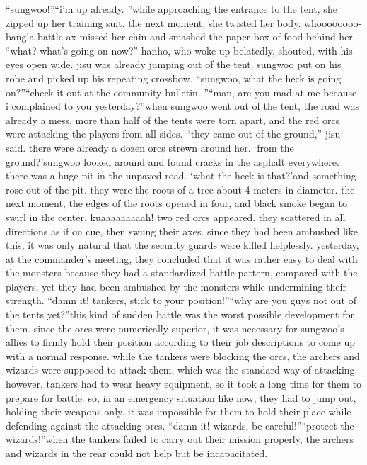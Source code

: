 “sungwoo!”“i’m up already.
”while approaching the entrance to the tent, she zipped up her training suit.
 the next moment, she twisted her body.
whoooooooo- bang!a battle ax missed her chin and smashed the paper box of food behind her.
“what? what’s going on now?” hanho, who woke up belatedly, shouted, with his eyes open wide.
jisu was already jumping out of the tent.
 sungwoo put on his robe and picked up his repeating crossbow.
“sungwoo, what the heck is going on?”“check it out at the community bulletin.
”“man, are you mad at me because i complained to you yesterday?”when sungwoo went out of the tent, the road was already a mess.
 more than half of the tents were torn apart, and the red orcs were attacking the players from all sides.
“they came out of the ground,” jisu said.
there were already a dozen orcs strewn around her.
‘from the ground?’sungwoo looked around and found cracks in the asphalt everywhere.
 there was a huge pit in the unpaved road.
‘what the heck is that?’and something rose out of the pit.
 they were the roots of a tree about 4 meters in diameter.
the next moment, the edges of the roots opened in four, and black smoke began to swirl in the center.
kuaaaaaaaaah!
two red orcs appeared.
 they scattered in all directions as if on cue, then swung their axes.
since they had been ambushed like this, it was only natural that the security guards were killed helplessly.
yesterday, at the commander’s meeting, they concluded that it was rather easy to deal with the monsters because they had a standardized battle pattern, compared with the players, yet they had been ambushed by the monsters while undermining their strength.
“damn it! tankers, stick to your position!”“why are you guys not out of the tents yet?”this kind of sudden battle was the worst possible development for them.
since the orcs were numerically superior, it was necessary for sungwoo’s allies to firmly hold their position according to their job descriptions to come up with a normal response.
while the tankers were blocking the orcs, the archers and wizards were supposed to attack them, which was the standard way of attacking.
however, tankers had to wear heavy equipment, so it took a long time for them to prepare for battle.
 so, in an emergency situation like now, they had to jump out, holding their weapons only.
 it was impossible for them to hold their place while defending against the attacking orcs.
“damn it! wizards, be careful!”“protect the wizards!”when the tankers failed to carry out their mission properly, the archers and wizards in the rear could not help but be incapacitated.
